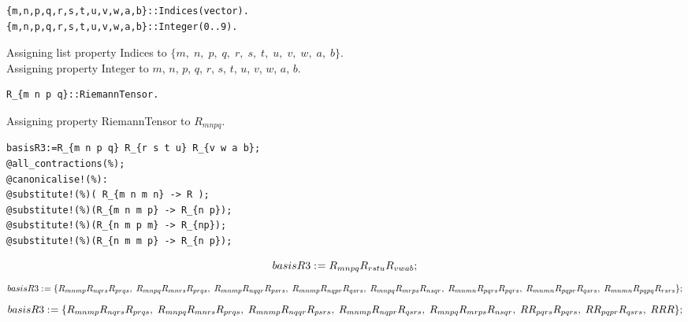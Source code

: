 \documentclass[11pt]{article}
\def\specialcolon{\mathrel{\mathop{:}}\hspace{-.5em}}
\begin{document}
{\color[named]{Blue}\begin{verbatim}
{m,n,p,q,r,s,t,u,v,w,a,b}::Indices(vector).
{m,n,p,q,r,s,t,u,v,w,a,b}::Integer(0..9).
\end{verbatim}}
Assigning list property Indices to $\{m,\; n,\; p,\; q,\; r,\; s,\; t,\; u,\; v,\; w,\; a,\; b\}$.
\\
Assigning property Integer to $m$, $n$, $p$, $q$, $r$, $s$, $t$, $u$, $v$, $w$, $a$, $b$.
\\
{\color[named]{Blue}\begin{verbatim}
R_{m n p q}::RiemannTensor.
\end{verbatim}}
Assigning property RiemannTensor to ${R}_{m n p q}$.
\\
{\color[named]{Blue}\begin{verbatim}
basisR3:=R_{m n p q} R_{r s t u} R_{v w a b};
@all_contractions(%);
@canonicalise!(%):
@substitute!(%)( R_{m n m n} -> R );
@substitute!(%)(R_{m n m p} -> R_{n p});
@substitute!(%)(R_{n m p m} -> R_{np});
@substitute!(%)(R_{n m m p} -> R_{n p});
\end{verbatim}}
\begin{dmath*}[compact, spread=2pt]
basisR3\specialcolon{}= {R}_{m n p q} {R}_{r s t u} {R}_{v w a b};
\end{dmath*}
\begin{dmath*}[compact, spread=2pt]
basisR3\specialcolon{}= \{{R}_{m n m p} {R}_{n q r s} {R}_{p r q s},\; {R}_{m n p q} {R}_{m n r s} {R}_{p r q s},\; {R}_{m n m p} {R}_{n q q r} {R}_{p s r s},\; {R}_{m n m p} {R}_{n q p r} {R}_{q s r s},\; {R}_{m n p q} {R}_{m r p s} {R}_{n s q r},\; {R}_{m n m n} {R}_{p q r s} {R}_{p q r s},\; {R}_{m n m n} {R}_{p q p r} {R}_{q s r s},\; {R}_{m n m n} {R}_{p q p q} {R}_{r s r s}\};
\end{dmath*}
\begin{dmath*}[compact, spread=2pt]
basisR3\specialcolon{}= \{{R}_{m n m p} {R}_{n q r s} {R}_{p r q s},\; {R}_{m n p q} {R}_{m n r s} {R}_{p r q s},\; {R}_{m n m p} {R}_{n q q r} {R}_{p s r s},\; {R}_{m n m p} {R}_{n q p r} {R}_{q s r s},\; {R}_{m n p q} {R}_{m r p s} {R}_{n s q r},\; R {R}_{p q r s} {R}_{p q r s},\; R {R}_{p q p r} {R}_{q s r s},\; R R R\};
\end{dmath*}
\end{document}
